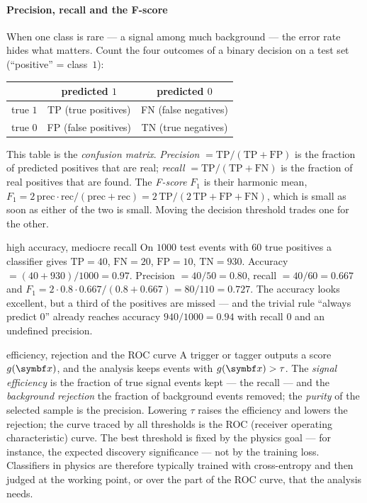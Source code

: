\documentclass[11pt]{article}
\begin{document}
\paragraph{Precision, recall and the F-score} When one class is rare --- a signal among much background --- the error
rate hides what matters. Count the four outcomes of a binary decision on a test set (``positive'' = class~$1$):
\begin{center}\small
\begin{tabular}{@{}lcc@{}}
\toprule
 & predicted $1$ & predicted $0$ \\
\midrule
true $1$ & TP (true positives) & FN (false negatives) \\
true $0$ & FP (false positives) & TN (true negatives) \\
\bottomrule
\end{tabular}
\end{center}
This table is the \emph{confusion matrix}. \emph{Precision} $= \mathrm{TP}/(\mathrm{TP} + \mathrm{FP})$ is the
fraction of predicted positives that are real; \emph{recall} $= \mathrm{TP}/(\mathrm{TP} + \mathrm{FN})$ is the
fraction of real positives that are found. The \emph{F-score} $F_1$ is their harmonic mean,
$F_1 = 2\,\mathrm{prec}\cdot\mathrm{rec}/(\mathrm{prec} + \mathrm{rec}) = 2\,\mathrm{TP}/(2\,\mathrm{TP} + \mathrm{FP}
+ \mathrm{FN})$, which is small as soon as either of the two is small. Moving the decision threshold trades one for the
other.

\begin{worked}{high accuracy, mediocre recall}
On $1000$ test events with $60$ true positives a classifier gives $\mathrm{TP} = 40$, $\mathrm{FN} = 20$,
$\mathrm{FP} = 10$, $\mathrm{TN} = 930$. Accuracy $= (40 + 930)/1000 = 0.97$. Precision $= 40/50 = 0.80$, recall
$= 40/60 = 0.667$ and $F_1 = 2 \cdot 0.8 \cdot 0.667/(0.8 + 0.667) = 80/110 = 0.727$. The accuracy looks excellent,
but a third of the positives are missed --- and the trivial rule ``always predict $0$'' already reaches accuracy
$940/1000 = 0.94$ with recall $0$ and an undefined precision.
\end{worked}

\begin{physics}{efficiency, rejection and the ROC curve}
A trigger or tagger outputs a score $g(\x)$, and the analysis keeps events with $g(\x) > \tau$. The \emph{signal
efficiency} is the fraction of true signal events kept --- the recall --- and the \emph{background rejection} the
fraction of background events removed; the \emph{purity} of the selected sample is the precision. Lowering $\tau$
raises the efficiency and lowers the rejection; the curve traced by all thresholds is the ROC (receiver operating
characteristic) curve. The
best threshold is fixed by the physics goal --- for instance, the expected discovery significance --- not by the
training loss. Classifiers in physics are therefore typically trained with cross-entropy and then judged at the working
point, or over the part of the ROC curve, that the analysis needs.
\end{physics}
\end{document}
